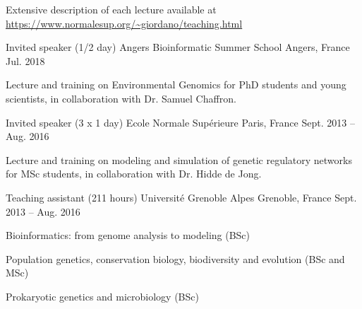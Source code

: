 
\begin{small}
Extensive description of each lecture available at \href{https://www.normalesup.org/\textasciitilde giordano/teaching.html}{https://www.normalesup.org/\textasciitilde giordano/teaching.html}
\end{small}

\begin{cventries}
  \cventry
    {Invited speaker (1/2 day)} %
    {Angers Bioinformatic Summer School} %
    {Angers, France} %
    {Jul. 2018} %
    {
	\begin{cvitems} %
		\item {Lecture and training on Environmental Genomics for PhD students and young scientists, in collaboration with Dr. Samuel Chaffron.}
	\end{cvitems}
    }
    
  \cventry
    {Invited speaker (3 x 1 day)} %
    {Ecole Normale Supérieure} %
    {Paris, France} %
    {Sept. 2013 -- Aug. 2016} %
    {
	\begin{cvitems} %
		\item {Lecture and training on modeling and simulation of genetic regulatory networks for MSc students, in collaboration with Dr. Hidde de Jong.}
	\end{cvitems}
    }
    
  \cventry
    {Teaching assistant (211 hours)} %
    {Université Grenoble Alpes} %
    {Grenoble, France} %
    {Sept. 2013 -- Aug. 2016} %
    {
	\begin{cvitems} %
		\item {Bioinformatics: from genome analysis to modeling (BSc)}
		\item {Population genetics, conservation biology, biodiversity and evolution (BSc and MSc)}
		\item {Prokaryotic genetics and microbiology (BSc)}
	\end{cvitems}
    }

\end{cventries}